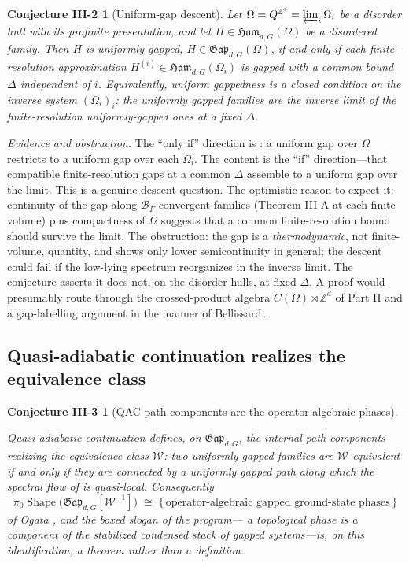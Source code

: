 \documentclass[12pt]{article}
\newcommand{\Shape}{\operatorname{Shape}}      %
\newcommand{\BF}{\mathcal{B}_{F}}              %
\newcommand{\Ham}{\mathfrak{Ham}}              %
\newcommand{\Gap}{\mathfrak{Gap}}              %
\newcommand{\Weq}{\mathcal{W}}                 %
\newcommand{\gapbound}{\Delta}                  %
\newcommand{\dis}{\Omega}                       %
\newcommand{\Z}{\mathbb{Z}}
\newcommand{\set}[1]{\{\,#1\,\}}
\theoremstyle{plain}
\newtheorem*{conjtwo}{Conjecture III-2}
\newtheorem*{conjthree}{Conjecture III-3}
\theoremstyle{definition}
\theoremstyle{remark}
\begin{document}
\begin{conjtwo}[Uniform-gap descent]
\label{conj:III2}
Let $\dis=Q^{\Z^d}=\varprojlim_i\dis_i$ be a disorder hull with its profinite
presentation, and let $H\in\Ham_{d,G}(\dis)$ be a disordered family. Then $H$ is
uniformly gapped, $H\in\Gap_{d,G}(\dis)$, if and only if each finite-resolution
approximation $H^{(i)}\in\Ham_{d,G}(\dis_i)$ is gapped with a common bound $\gapbound$
independent of $i$. Equivalently, uniform gappedness is a \emph{closed} condition on
the inverse system $(\dis_i)_i$: the uniformly gapped families are the inverse limit
of the finite-resolution uniformly-gapped ones at a fixed $\gapbound$.
\end{conjtwo}

\emph{Evidence and obstruction.} The ``only if'' direction is : a
uniform gap over $\dis$ restricts to a uniform gap over each $\dis_i$. The content is
the ``if'' direction---that compatible finite-resolution gaps at a common $\gapbound$
assemble to a uniform gap over the limit. This is a genuine descent question. The
optimistic reason to expect it: continuity of the gap along $\BF$-convergent families
(Theorem III-A at each finite volume) plus compactness of $\dis$ suggests that a
common finite-resolution bound should survive the limit. The obstruction: the gap is a
\emph{thermodynamic}, not finite-volume, quantity, and  shows only
lower semicontinuity in general; the descent could fail if the low-lying spectrum
reorganizes in the inverse limit. The conjecture asserts it does not, on the disorder
hulls, at fixed $\gapbound$. A proof would presumably route through the crossed-product
algebra $C(\dis)\rtimes\Z^d$ of Part II and a gap-labelling argument in the manner of
Bellissard \cite{bellissard-ncg-qhe}.

\subsection{Quasi-adiabatic continuation realizes the equivalence class}
\label{sec:conj-qac}

\begin{conjthree}[QAC path components are the operator-algebraic phases]
\label{conj:III3}
\leavevmode\par\noindent
Quasi-adiabatic continuation defines, on $\Gap_{d,G}$, the internal path components
realizing the equivalence class $\Weq$: two uniformly gapped families are
$\Weq$-equivalent if and only if they are connected by a uniformly gapped path along
which the spectral flow of  is quasi-local. Consequently
\[
\pi_0\Shape\!\big(\Gap_{d,G}[\Weq^{-1}]\big)\;\cong\;
\set{\text{operator-algebraic gapped ground-state phases}}
\]
of Ogata \cite{ogata-classification-review}, and the boxed slogan of the program---%
\emph{a topological phase is a component of the stabilized condensed stack of gapped
systems}---is, on this identification, a theorem rather than a definition.
\end{conjthree}
\end{document}
